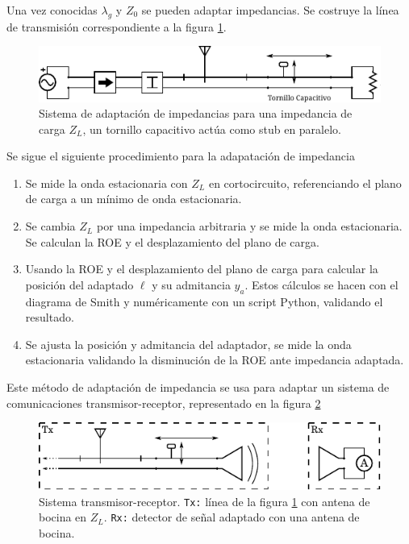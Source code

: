 \documentclass[11pt,a4paper]{article}
\begin{document}
\begin{multicols}{2}
Una vez conocidas $\lambda_g$ y $Z_0$ se pueden adaptar impedancias. Se costruye la línea de transmisión correspondiente a la figura \ref{fig:arr4}.

\begin{figure}[H]
    \centering
    \includegraphics[width=\linewidth]{Images/arreglo4.pdf}
    \caption{Sistema de adaptación de impedancias para una impedancia de carga $Z_L$, un tornillo capacitivo actúa como stub en paralelo.}
    \label{fig:arr4}
\end{figure}

Se sigue el siguiente procedimiento para la adapatación de impedancia

\begin{enumerate}
    \item Se mide la onda estacionaria con $Z_L$ en cortocircuito, referenciando el plano de carga a un mínimo de onda estacionaria.
    \item Se cambia $Z_L$ por una impedancia arbitraria y se mide la onda estacionaria. Se calculan la ROE y el desplazamiento del plano de carga.
    \item Usando la ROE y el desplazamiento del plano de carga para calcular la posición del adaptado $\ell$ y su admitancia $y_a$. Estos cálculos se hacen con el diagrama de Smith y numéricamente con un script Python, validando el resultado.
    \item Se ajusta la posición y admitancia del adaptador, se mide la onda estacionaria validando la disminución de la ROE ante impedancia adaptada.
\end{enumerate}

Este método de adaptación de impedancia se usa para adaptar un sistema de comunicaciones transmisor-receptor, representado en la figura \ref{fig:sistema}

\begin{figure}[H]
    \centering
    \includegraphics[width=\linewidth]{Images/sistema.pdf}
    \caption{Sistema transmisor-receptor.
    \texttt{Tx:} línea de la figura \ref{fig:arr4} con antena de bocina en $Z_L$. 
    \texttt{Rx:} detector de señal adaptado con una antena de bocina.}
    \label{fig:sistema}
\end{figure}


\end{multicols}
\end{document}
